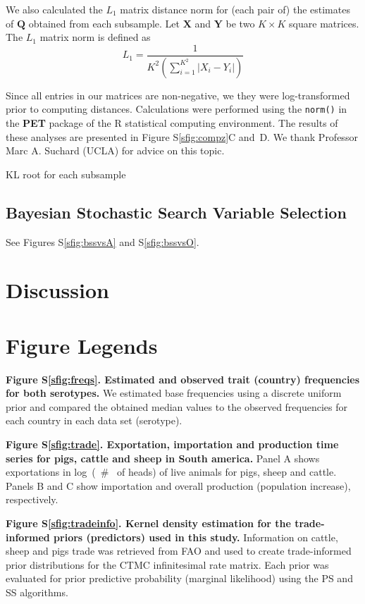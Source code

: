 \documentclass[a4paper,10pt]{article}
\begin{document}
We also calculated the $L_1$ matrix distance norm for (each pair of) the estimates of $\mathbf{Q}$ obtained from each subsample.
Let $\mathbf{X}$ and $\mathbf{Y}$ be two $K \times K$ square matrices.
The $L_1$ matrix norm is defined as
\begin{equation}
 L_1 = \frac{1}{K^{2} (\sum_{i=1}^{K^2} |X_i-Y_i| ) }
\end{equation}

Since all entries in our matrices are non-negative, we they were log-transformed prior to computing distances.
Calculations were performed using the \verb|norm()| in the \textbf{PET} package of the R statistical computing environment.
The results of these analyses are presented in Figure S\ref{sfig:compz}C and~D.
We thank Professor Marc A. Suchard (UCLA) for advice on this topic.

KL root for each subsample \cite{KL}
\subsection{Bayesian Stochastic Search Variable Selection}
See Figures S\ref{sfig:bssvsA} and S\ref{sfig:bssvsO}. 
\section{Discussion}
\newpage
\section*{Figure Legends}
\textbf{Figure S\ref{sfig:freqs}. Estimated and observed trait (country) frequencies for both serotypes.}
We estimated base frequencies using a discrete uniform prior and compared the obtained median values to the observed frequencies for each country in each data set (serotype). 

\textbf{Figure S\ref{sfig:trade}. Exportation, importation and production time series for pigs, cattle and sheep in South america.}
Panel A shows exportations in log~(~\# ~of heads) of live animals for pigs, sheep and cattle.
Panels B and C show importation and overall production (population increase), respectively.

\textbf{Figure S\ref{sfig:tradeinfo}. Kernel density estimation for the trade-informed priors (predictors) used in this study.}
Information on cattle, sheep and pigs trade was retrieved from FAO and used to create trade-informed prior distributions for the CTMC infinitesimal rate matrix.
Each prior was evaluated for prior predictive probability (marginal likelihood) using the PS and SS algorithms. 
\end{document}
